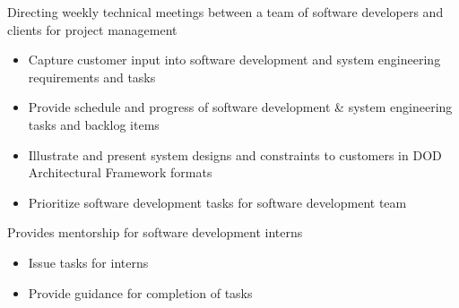 \documentclass[letterpaper]{clinton-resume}
\begin{document}
\begin{minipage}[t]{0.66\textwidth}
\vspace{\topsep} %
\begin{tightitemize}
\item Directing weekly technical meetings between a team of software developers and clients for project management
	\begin{itemize}
	\item Capture customer input into software development and system engineering requirements and tasks
	\item Provide schedule and progress of software development \& system engineering tasks and backlog items
	\item Illustrate and present system designs and constraints to customers in DOD Architectural Framework formats
	\item Prioritize software development tasks for software development team
	\end{itemize}
\item Provides mentorship for software development interns
	\begin{itemize}
	\item Issue tasks for interns
	\item Provide guidance for completion of tasks
	\end{itemize}
\end{tightitemize}
\sectionspace %
\end{minipage}
\end{document}

